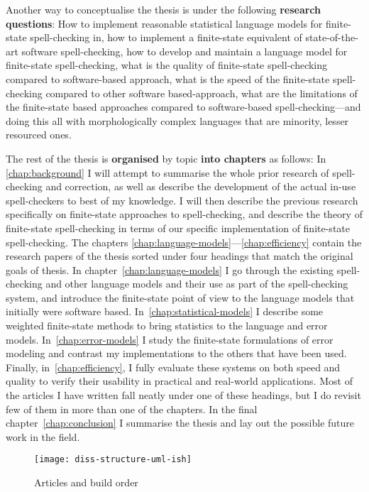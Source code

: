 \documentclass[officiallayout]{unihelcompling}
\begin{document}
Another way to conceptualise the thesis is under the following \textbf{research
questions}: How to implement reasonable statistical language models for
finite-state spell-checking in, how to implement a finite-state equivalent of
state-of-the-art software spell-checking, how to develop and maintain a
language model for finite-state spell-checking, what is the quality of
finite-state spell-checking compared to software-based approach, what is the
speed of the finite-state spell-checking compared to other software
based-approach, what are the limitations of the finite-state based approaches
compared to software-based spell-checking---and doing this all with
morphologically complex languages that are minority, lesser resourced ones.

The rest of the thesis is \textbf{organised} by topic \textbf{into chapters} as
follows: In \ref{chap:background} I will attempt to summarise the whole prior
research of spell-checking and correction, as well as describe the development
of the actual in-use spell-checkers to best of my knowledge. I will then
describe the previous research specifically on finite-state approaches to
spell-checking, and describe the theory of finite-state spell-checking in terms
of our specific implementation of finite-state spell-checking. The chapters
\ref{chap:language-models}---\ref{chap:efficiency} contain the research papers
of the thesis sorted under four headings that match the original goals of
thesis.  In chapter~\ref{chap:language-models} I go through the existing
spell-checking and other language models and their use as part of the
spell-checking system, and introduce the finite-state point of view to the
language models that initially were software based.
In~\ref{chap:statistical-models} I describe some weighted finite-state methods
to bring statistics to the language and error models.
In~\ref{chap:error-models} I study the finite-state formulations of error
modeling and contrast my implementations to the others that have been used.
Finally, in~\ref{chap:efficiency}, I fully evaluate these systems on both speed
and quality to verify their usability in practical and real-world applications.
Most of the articles I have written fall neatly under one of these headings,
but I do revisit few of them in more than one of the chapters. In the final
chapter~\ref{chap:conclusion} I summarise the thesis and lay out the possible
future work in the field.

\begin{figure}
    \texttt{[image: diss-structure-uml-ish]}
    \caption{Articles and build order
    \label{fig:schematic-diagram}}
\end{figure}
\end{document}
